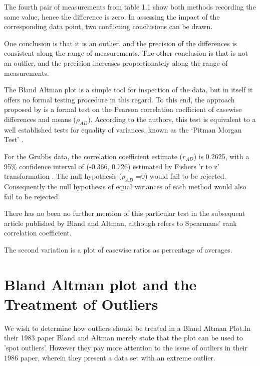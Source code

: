 \documentclass[Chap2main.tex]{subfiles}
\begin{document}
	
	
	The fourth pair of measurements from table 1.1 show both methods
	recording the same value, hence the difference is zero. In
	assessing the impact of the corresponding data point, two
	conflicting conclusions can be drawn.
	
	One conclusion is that it is an outlier, and the precision of the
	differences is consistent along the range of measurements. The
	other conclusion is that is not an outlier, and the precision
	increases proportionately along the range of measurements.
	
	The Bland Altman plot is a simple tool for inspection of the data,
	but in itself it offers no formal testing procedure in this
	regard. To this end, the approach proposed by \citet{BA83} is a
	formal test on the Pearson correlation coefficient  of casewise
	differences and means ($\rho_{AD}$). According to the authors,
	this test is equivalent to a well established tests for equality
	of variances, known as the `Pitman Morgan Test' \citep{Pitman,
		Morgan}.
	
	For the Grubbs data, the correlation coefficient estimate
	($r_{AD}$) is 0.2625, with a 95\% confidence interval of (-0.366,
	0.726) estimated by Fishers 'r to z' transformation \citep{Cohen}.
	The null hypothesis ($\rho_{AD}$ =0) would fail to be rejected.
	Consequently the null hypothesis of equal variances of each method
	would also fail to be rejected.
	
	There has no been no further mention of this particular test in
	the subsequent article published by Bland and Altman, although
	\citet{BA99} refers to Spearmans' rank correlation coefficient.
	
	The second variation is a plot of casewise ratios as percentage of
	averages.
	
	
	
	\section{Bland Altman plot and the Treatment of Outliers}
	We wish to determine how outliers should be treated in a Bland
	Altman Plot.In their 1983 paper Bland and Altman  merely state
	that the plot can be used to 'spot outliers'. However they pay
	more attention to the issue of outliers in their $1986$ paper,
	wherein they present a data set with an extreme outlier.
	
\end{document}
